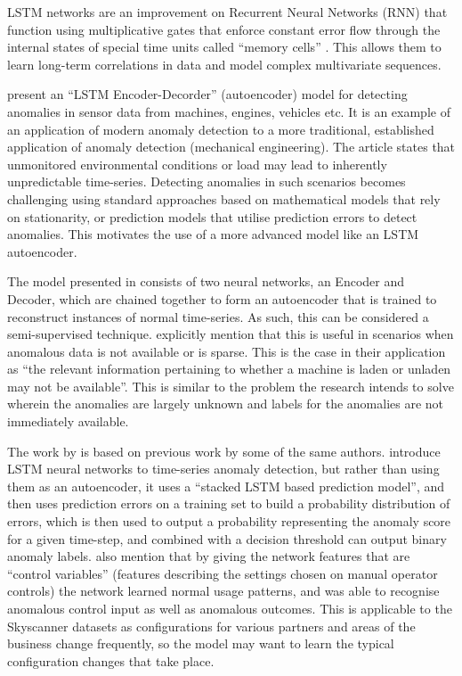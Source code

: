 \documentclass{mproj}
\begin{document}
LSTM networks are an improvement on Recurrent Neural Networks (RNN) that function using multiplicative gates that enforce constant error flow through the internal states of special time units called ``memory cells'' \citep{lstmTimeSeriesAnomalyDetection}. This allows them to learn long-term correlations in data and model complex multivariate sequences.

\cite{lstmEncoderDecorder} present an ``LSTM Encoder-Decorder'' (autoencoder) model for detecting anomalies in sensor data from machines, engines, vehicles etc. It is an example of an application of modern anomaly detection to a more traditional, established application of anomaly detection (mechanical engineering). The article states that unmonitored environmental conditions or load may lead to inherently unpredictable time-series. Detecting anomalies in such scenarios becomes challenging using standard approaches based on mathematical models that rely on stationarity, or prediction models that utilise prediction errors to detect anomalies. This motivates the use of a more advanced model like an LSTM autoencoder.

The model presented in \cite{lstmEncoderDecorder} consists of two neural networks, an Encoder and Decoder, which are chained together to form an autoencoder that is trained to reconstruct instances of normal time-series. As such, this can be considered a semi-supervised technique. \cite{lstmEncoderDecorder} explicitly mention that this is useful in scenarios when anomalous data is not available or is sparse. This is the case in their application as ``the relevant information pertaining to whether a machine is laden or unladen may not be available''. This is similar to the problem the research intends to solve wherein the anomalies are largely unknown and labels for the anomalies are not immediately available.

The work by \cite{lstmEncoderDecorder} is based on previous work by some of the same authors. \cite{lstmTimeSeriesAnomalyDetection} introduce LSTM neural networks to time-series anomaly detection, but rather than using them as an autoencoder, it uses a ``stacked LSTM based prediction model'', and then uses prediction errors on a training set to build a probability distribution of errors, which is then used to output a probability representing the anomaly score for a given time-step, and combined with a decision threshold can output binary anomaly labels. \cite{lstmTimeSeriesAnomalyDetection} also mention that by giving the network features that are ``control variables'' (features describing the settings chosen on manual operator controls) the network learned normal usage patterns, and was able to recognise anomalous control input as well as anomalous outcomes. This is applicable to the Skyscanner datasets as configurations for various partners and areas of the business change frequently, so the model may want to learn the typical configuration changes that take place.
\end{document}
